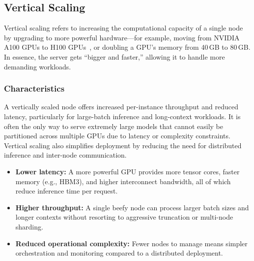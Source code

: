 \subsection{Vertical Scaling}
\label{sec:scaling-vertical}
Vertical scaling refers to increasing the computational capacity of a single node by upgrading to more powerful hardware---for example, moving from NVIDIA A100 GPUs to H100 GPUs~\cite{hopper2022}, or doubling a GPU’s memory from 40\,GB to 80\,GB. In essence, the server gets ``bigger and faster,'' allowing it to handle more demanding workloads.

\subsubsection{Characteristics}
A vertically scaled node offers increased per-instance throughput and reduced latency, particularly for large-batch inference and long-context workloads. It is often the only way to serve extremely large models that cannot easily be partitioned across multiple GPUs due to latency or complexity constraints. Vertical scaling also simplifies deployment by reducing the need for distributed inference and inter-node communication.

\begin{tcolorbox}[
  title={\textbf{Vertical Scaling: Pros}},
  colback=green!5,
  colframe=green!40!black,
  colbacktitle=green!20,
  coltitle=black,
  fonttitle=\bfseries,
  boxrule=0.7pt,
  arc=4pt,
  left=5mm, right=5mm, top=4mm, bottom=4mm,
  before skip=6pt,
  after skip=6pt
]
\begin{itemize}[leftmargin=1.5em, itemsep=3pt]
    \item \textbf{Lower latency:} A more powerful GPU provides more tensor cores, faster memory (e.g., HBM3), and higher interconnect bandwidth, all of which reduce inference time per request.
    \item \textbf{Higher throughput:} A single beefy node can process larger batch sizes and longer contexts without resorting to aggressive truncation or multi-node sharding.
    \item \textbf{Reduced operational complexity:} Fewer nodes to manage means simpler orchestration and monitoring compared to a distributed deployment.
\end{itemize}
\end{tcolorbox}

